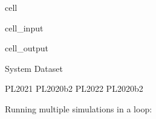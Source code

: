 \documentclass[letterpaper,10pt,english]{sphinxmanual}
\begin{document}
\begin{sphinxuseclass}{cell}
\begin{sphinxuseclass}{cell_input}
\begin{sphinxVerbatim}[commandchars=\\\{\}]
    
      \PYG{p}{[}\PYG{p}{]}\PYG{p}{[}\PYG{p}{]}\PYG{p}{[}\PYG{p}{]}
      
\end{sphinxVerbatim}

\end{sphinxuseclass}
\begin{sphinxuseclass}{cell_output}
\begin{sphinxVerbatim}[commandchars=\\\{\}]
System    Dataset
\end{sphinxVerbatim}

\begin{sphinxVerbatim}[commandchars=\\\{\}]
PL\PYGZus{}2021   PL\PYGZus{}2020\PYGZus{}b2
PL\PYGZus{}2022   PL\PYGZus{}2020\PYGZus{}b2
\end{sphinxVerbatim}

\end{sphinxuseclass}
\end{sphinxuseclass}
\sphinxAtStartPar
Running multiple simulations in a loop:
\end{document}
